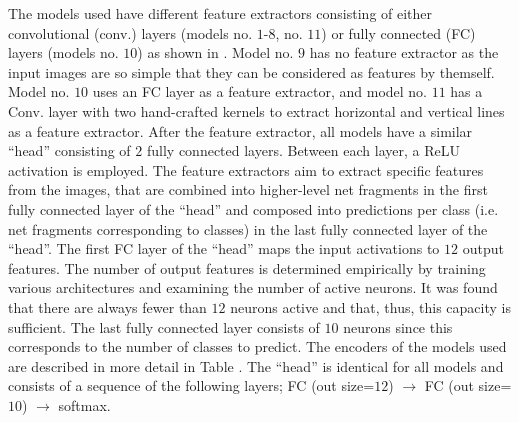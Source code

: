The models used have different feature extractors consisting of either convolutional (conv.) layers (models no. $1$-$8$, no. $11$) or fully connected (FC) layers (models no. $10$) as shown in .
Model no. $9$ has no feature extractor as the input images are so simple that they can be considered as features by themself. Model no. $10$ uses an FC layer as a feature extractor, and model no. $11$ has a Conv. layer with two hand-crafted kernels to extract horizontal and vertical lines as a feature extractor.
After the feature extractor, all models have a similar ``head'' consisting of $2$ fully connected layers.
Between each layer, a ReLU activation is employed.
The feature extractors aim to extract specific features from the images, that are combined into higher-level net fragments in the first fully connected layer of the ``head'' and composed into predictions per class (i.e. net fragments corresponding to classes) in the last fully connected layer of the ``head''.
The first FC layer of the ``head'' maps the input activations to $12$ output features.
The number of output features is determined empirically by training various architectures and examining the number of active neurons.
It was found that there are always fewer than $12$ neurons active and that, thus, this capacity is sufficient.
The last fully connected layer consists of $10$ neurons since this corresponds to the number of classes to predict.
The encoders of the models used are described in more detail in Table .
The ``head'' is identical for all models and consists of a sequence of the following layers; FC (out size=$12$) $\rightarrow$ FC (out size=$10$) $\rightarrow$ softmax.


